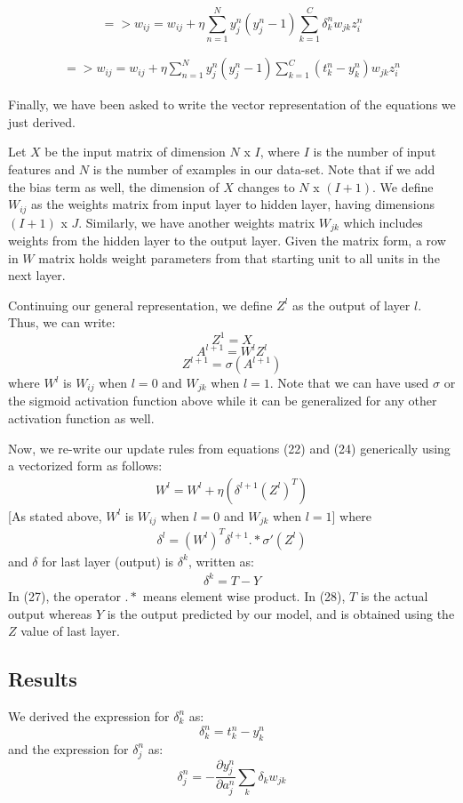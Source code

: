 \documentclass{article}
\begin{document}
$$
=> w_{ij} = w_{ij} + \eta \sum_{n=1}^{N} y_{j}^{n}(y_{j}^{n} - 1) \sum_{k=1}^{C}  \delta_{k}^{n} w_{jk} z_{i}^{n}
$$

\begin{align}
=> w_{ij} = w_{ij} + \eta \sum_{n=1}^{N} y_{j}^{n}(y_{j}^{n} - 1) \sum_{k=1}^{C}  (t_{k}^{n} - y_{k}^{n}) w_{jk} z_{i}^{n}
\end{align}

Finally, we have been asked to write the vector representation of the equations we just derived. 

Let $X$ be the input matrix of dimension $N$ x $I$, where $I$ is the number of input features and $N$ is the number of examples in our data-set. Note that if we add the bias term as well, the dimension of $X$ changes to $N$ x $(I+1)$. We define $W_{ij}$ as the weights matrix from input layer to hidden layer, having dimensions $(I+1)$ x $J$. Similarly, we have another weights matrix $W_{jk}$ which includes weights from the hidden layer to the output layer. Given the matrix form, a row in $W$ matrix holds weight parameters from that starting unit to all units in the next layer.

Continuing our general representation, we define $Z^l$ as the output of layer $l$. Thus, we can write:
$$Z^1 = X$$ 
$$A^{l+1} = W^lZ^l$$ 
$$Z^{l+1} = \sigma(A^{l+1})$$
where $W^l$ is $W_{ij}$ when $l = 0$ and $W_{jk}$ when $l = 1$. Note that we can have used $\sigma$ or the sigmoid activation function above while it can be generalized for any other activation function as well.

Now, we re-write our update rules from equations (22) and (24) generically using a vectorized form as follows:
\begin{align}
W^{l} = W^{l} + \eta(\delta^{l+1}(Z^l)^T)
\end{align}
[As stated above, $W^l$ is $W_{ij}$ when $l = 0$ and $W_{jk}$ when $l = 1$]
where
\begin{align}
\delta^{l} = (W^{l})^T \delta^{l+1} .* \sigma'(Z^l)
\end{align}
and $\delta$ for last layer (output) is $\delta^k$, written as:
\begin{align}
\delta^{k} = T - Y
\end{align}
In (27), the operator $.*$ means element wise product. In (28), $T$ is the actual output whereas $Y$ is the output predicted by our model, and is obtained using the $Z$ value of last layer. 

\subsection{Results}
We derived the expression for $\delta_k^n$ as:
$$ \delta_k^{n} = t^{n}_{k} - y_{k}^{n}$$
and the expression for $\delta_j^n$ as:
$$\delta_{j}^{n} = - \frac{\partial y_{j}^{n}}{\partial a_{j}^{n}} \sum_{k}\delta_{k} w_{jk}$$
\end{document}
